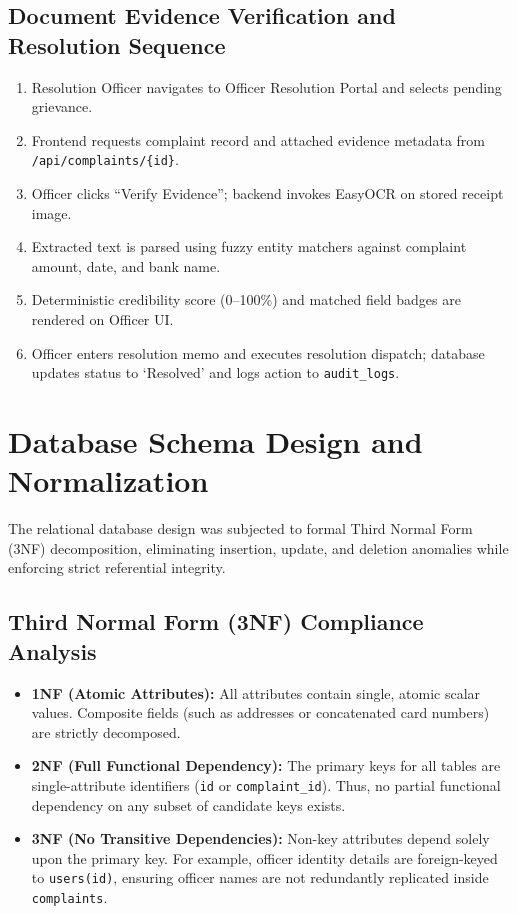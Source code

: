 \subsection{Document Evidence Verification and Resolution Sequence}
\begin{enumerate}
    \item Resolution Officer navigates to Officer Resolution Portal and selects pending grievance.
    \item Frontend requests complaint record and attached evidence metadata from \texttt{/api/complaints/\{id\}}.
    \item Officer clicks ``Verify Evidence''; backend invokes EasyOCR on stored receipt image.
    \item Extracted text is parsed using fuzzy entity matchers against complaint amount, date, and bank name.
    \item Deterministic credibility score (0--100\%) and matched field badges are rendered on Officer UI.
    \item Officer enters resolution memo and executes resolution dispatch; database updates status to `Resolved' and logs action to \texttt{audit\_logs}.
\end{enumerate}

\section{Database Schema Design and Normalization}
The relational database design was subjected to formal Third Normal Form (3NF) decomposition, eliminating insertion, update, and deletion anomalies while enforcing strict referential integrity.

\subsection{Third Normal Form (3NF) Compliance Analysis}
\begin{itemize}
    \item \textbf{1NF (Atomic Attributes):} All attributes contain single, atomic scalar values. Composite fields (such as addresses or concatenated card numbers) are strictly decomposed.
    \item \textbf{2NF (Full Functional Dependency):} The primary keys for all tables are single-attribute identifiers (\texttt{id} or \texttt{complaint\_id}). Thus, no partial functional dependency on any subset of candidate keys exists.
    \item \textbf{3NF (No Transitive Dependencies):} Non-key attributes depend solely upon the primary key. For example, officer identity details are foreign-keyed to \texttt{users(id)}, ensuring officer names are not redundantly replicated inside \texttt{complaints}.
\end{itemize}


